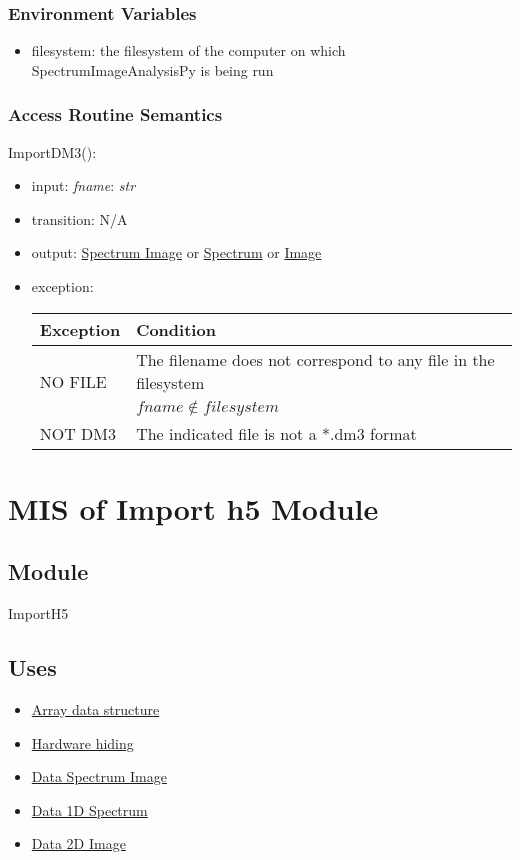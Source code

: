 \documentclass[12pt, titlepage]{article}
\newcommand{\progname}{SpectrumImageAnalysisPy}
\begin{document}
\subsubsection{Environment Variables}
\begin{itemize}
\item filesystem: the filesystem of the computer on which \progname{} is being run
\end{itemize}
\subsubsection{Access Routine Semantics}

\noindent ImportDM3():
\begin{itemize}
\item input: \textit{fname}: \textit{str}
\item transition: N/A
\item output: \hyperref[Mod:SI]{Spectrum Image} or \hyperref[Mod:Spectrum]{Spectrum} or \hyperref[Mod:Image]{Image}
\item exception: 
\begin{center}
    \begin{tabular}{p{3cm} p{12cm}}
        \toprule[0.15em]
        \textbf{Exception} & \textbf{Condition}\\
        \midrule[0.1em]
        \multirow{2}{0.25\textwidth}{NO FILE} & The filename does not correspond to any file in the filesystem\\ 
        & $fname \notin filesystem$\\ 
        \midrule[0.05em]
        NOT DM3 & The indicated file is not a *.dm3 format\\
        \bottomrule[0.15em]
    \end{tabular}
\end{center}

\end{itemize}

\section{MIS of Import h5 Module} \label{Mod:ImportH5} 

\subsection{Module}
ImportH5

\subsection{Uses}
\begin{itemize}
    \item \hyperref[Mod:Array]{Array data structure}
    \item \hyperref[Mod:HH]{Hardware hiding}
    \item \hyperref[Mod:SI]{Data Spectrum Image}
    \item \hyperref[Mod:Spectrum]{Data 1D Spectrum}
    \item \hyperref[Mod:Image]{Data 2D Image}
\end{itemize}
\end{document}
